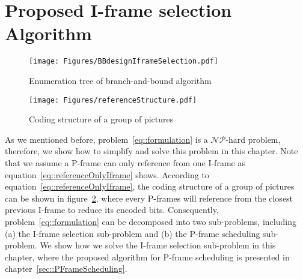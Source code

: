 \section{Proposed I-frame selection Algorithm}
\label{sec::IFrameSelection}
\begin{figure}
\begin{center}
\texttt{[image: Figures/BBdesignIframeSelection.pdf]}
\caption{\label{fig::BBdesgin}Enumeration tree of branch-and-bound algorithm}
\end{center}
\end{figure}
%
\begin{figure}
\begin{center}
\texttt{[image: Figures/referenceStructure.pdf]}
\caption{\label{fig::encodeOrder}Coding structure of a group of pictures}
\end{center}
\end{figure}
As we mentioned before, problem~\eqref{eq::formulation} is a $\mathcal{NP}$-hard problem, therefore, we show how to simplify and solve this problem in this chapter.
Note that we assume a P-frame can only reference from one I-frame as equation~\eqref{eq::referenceOnlyIframe} shows.
According to equation~\eqref{eq::referenceOnlyIframe}, the coding structure of a group of pictures can be shown in figure~\ref{fig::encodeOrder}, where every P-frames will reference from the closest previous I-frame to reduce its encoded bits.
Consequently, problem~\eqref{eq::formulation} can be decomposed into two sub-problems, including (a) the I-frame selection sub-problem and (b) the P-frame scheduling sub-problem.
We show how we solve the I-frame selection sub-problem in this chapter, where the proposed algorithm for P-frame scheduling is presented in chapter~\ref{sec::PFrameScheduling}.

